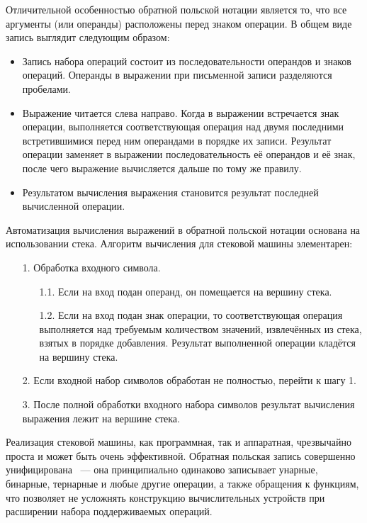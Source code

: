 Отличительной особенностью обратной польской нотации является то, что все аргументы (или операнды) расположены перед знаком операции. В общем виде запись выглядит следующим образом:
\begin{itemize}
\item Запись набора операций состоит из последовательности операндов и знаков операций. Операнды в выражении при письменной записи разделяются пробелами.
\item Выражение читается слева направо. Когда в выражении встречается знак операции, выполняется соответствующая операция над двумя последними встретившимися перед ним операндами в порядке их записи. Результат операции заменяет в выражении последовательность её операндов и её знак, после чего выражение вычисляется дальше по тому же правилу.
\item Результатом вычисления выражения становится результат последней вычисленной операции.
\end{itemize}

Автоматизация вычисления выражений в обратной польской нотации основана на использовании стека. Алгоритм вычисления для стековой машины элементарен:
\begin{enumerate}
\item[1.] Обработка входного символа.
\begin{enumerate}
\item[1.1.] Если на вход подан операнд, он помещается на вершину стека.
\item[1.2.] Если на вход подан знак операции, то соответствующая операция выполняется над требуемым количеством значений, извлечённых из стека, взятых в порядке добавления. Результат выполненной операции кладётся на вершину стека.
\end{enumerate}
\item[2.] Если входной набор символов обработан не полностью, перейти к шагу 1.
\item[3.] После полной обработки входного набора символов результат вычисления выражения лежит на вершине стека.
\end{enumerate}

Реализация стековой машины, как программная, так и аппаратная, чрезвычайно проста и может быть очень эффективной. Обратная польская запись совершенно унифицирована ~--- она принципиально одинаково записывает унарные, бинарные, тернарные и любые другие операции, а также обращения к функциям, что позволяет не усложнять конструкцию вычислительных устройств при расширении набора поддерживаемых операций.

